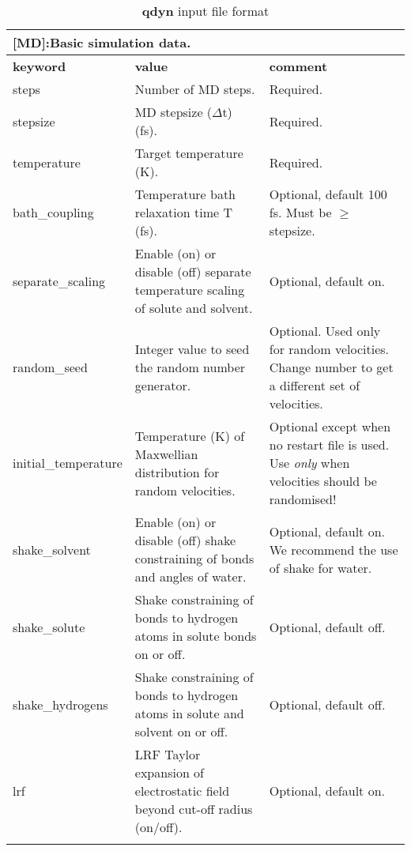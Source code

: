 \documentclass[a4paper,10pt]{article}
\begin{document}
\begin{longtable}{|p{78pt}|p{158pt}|p{158pt}|}
\caption{\textbf{qdyn} input file format}
\label{tab:qdyninputfileformat}
\endhead

\multicolumn{3}{p{394pt}}{[\textbf{MD}]:Basic simulation data.}\\
\hline \textbf{keyword} & \textbf{value} & \textbf{comment}\\
\hline steps & Number of MD steps. & Required.\\
\hline stepsize & MD stepsize ($\Delta$t) (fs). & Required.\\
\hline temperature & Target temperature (K). & Required.\\
\hline bath\_coupling & Temperature bath relaxation time T (fs)\cite{Berendsen:1984}. & Optional, default 100 fs. Must be $\geq$ stepsize. \\
\hline separate\_scaling & Enable (on) or disable (off) separate temperature scaling of solute and solvent. & Optional, default on. \\
\hline random\_seed & Integer value to seed the random number generator. & Optional. Used only for random velocities. Change number to get a different set of velocities.\\
\hline initial\_temperature & Temperature (K) of Maxwellian distribution for random velocities. & Optional except when no restart file is used. Use \emph{only} when velocities should be randomised!\\
\hline shake\_solvent & Enable (on) or disable (off) shake constraining of bonds and angles of water. & Optional, default on. We recommend the use of shake for water.\\
\hline shake\_solute & Shake constraining of bonds to hydrogen atoms in solute bonds on or off. & Optional, default off.\\
\hline shake\_hydrogens & Shake constraining of bonds to hydrogen atoms in solute and solvent on or off.  & Optional, default off. \\
\hline lrf & LRF Taylor expansion of electrostatic field beyond cut-off radius (on/off). & Optional, default on.\\
\hline
\multicolumn{3}{p{394pt}}{}\\


\end{longtable}
\end{document}

